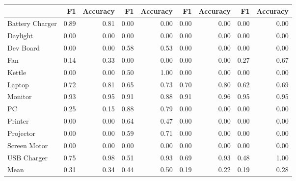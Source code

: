 \begin{tabular}{lrrrrrrrr}
\toprule
{} &    F1 &  Accuracy &    F1 &  Accuracy &    F1 &  Accuracy &    F1 &  Accuracy \\
\midrule
Battery Charger &  0.89 &      0.81 &  0.00 &      0.00 &  0.00 &      0.00 &  0.00 &      0.00 \\
Daylight        &  0.00 &      0.00 &  0.00 &      0.00 &  0.00 &      0.00 &  0.00 &      0.00 \\
Dev Board       &  0.00 &      0.00 &  0.58 &      0.53 &  0.00 &      0.00 &  0.00 &      0.00 \\
Fan             &  0.14 &      0.33 &  0.00 &      0.00 &  0.00 &      0.00 &  0.27 &      0.67 \\
Kettle          &  0.00 &      0.00 &  0.50 &      1.00 &  0.00 &      0.00 &  0.00 &      0.00 \\
Laptop          &  0.72 &      0.81 &  0.65 &      0.73 &  0.70 &      0.80 &  0.62 &      0.69 \\
Monitor         &  0.93 &      0.95 &  0.91 &      0.88 &  0.91 &      0.96 &  0.95 &      0.95 \\
PC              &  0.25 &      0.15 &  0.88 &      0.79 &  0.00 &      0.00 &  0.00 &      0.00 \\
Printer         &  0.00 &      0.00 &  0.64 &      0.47 &  0.00 &      0.00 &  0.00 &      0.00 \\
Projector       &  0.00 &      0.00 &  0.59 &      0.71 &  0.00 &      0.00 &  0.00 &      0.00 \\
Screen Motor    &  0.00 &      0.00 &  0.00 &      0.00 &  0.00 &      0.00 &  0.00 &      0.00 \\
USB Charger     &  0.75 &      0.98 &  0.51 &      0.93 &  0.69 &      0.93 &  0.48 &      1.00 \\
Mean            &  0.31 &      0.34 &  0.44 &      0.50 &  0.19 &      0.22 &  0.19 &      0.28 \\
\bottomrule
\end{tabular}
